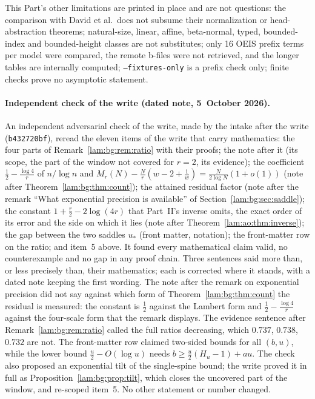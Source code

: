 \documentclass[11pt,a4paper]{article}
\numberwithin{equation}{section}
\theoremstyle{remark}
\begin{document}
This Part's other limitations are printed in place and are not questions: the comparison with David et al.\ does not subsume their normalization or head-abstraction theorems; natural-size, linear, affine, beta-normal, typed, bounded-index and bounded-height classes are not substitutes; only 16 OEIS prefix terms per model were compared, the remote b-files were not retrieved, and the longer tables are internally computed; \texttt{--fixtures-only} is a prefix check only; finite checks prove no asymptotic statement.

\paragraph{Independent check of the write (dated note, 5~October 2026).}
An independent adversarial check of the write, made by the intake after the write (\texttt{b432720bf}), reread the eleven items of the write that carry mathematics: the four parts of Remark~\ref{lam:bg:rem:ratio} with their proofs; the note after it (its scope, the part of the window not covered for $r=2$, its evidence); the coefficient $\frac12-\frac{\log4}r$ of $n/\log n$ and $M_r(N)-\frac Nr(w-2+\frac1w)=\frac N{2\log N}(1+o(1))$ (note after Theorem~\ref{lam:bg:thm:count}); the attained residual factor (note after the remark ``What exponential precision is available'' of Section~\ref{lam:bg:sec:saddle}); the constant $1+\frac r2-2\log(4r)$ that Part~II's inverse omits, the exact order of its error and the side on which it lies (note after Theorem~\ref{lam:ao:thm:inverse}); the gap between the two saddles $u_*$ (front matter, notation); the front-matter row on the ratio; and item~5 above. It found every mathematical claim valid, no counterexample and no gap in any proof chain. Three sentences said more than, or less precisely than, their mathematics; each is corrected where it stands, with a dated note keeping the first wording. The note after the remark on exponential precision did not say against which form of Theorem~\ref{lam:bg:thm:count} the residual is measured: the constant is $\frac12$ against the Lambert form and $\frac12-\frac{\log4}r$ against the four-scale form that the remark displays. The evidence sentence after Remark~\ref{lam:bg:rem:ratio} called the full ratios decreasing, which $0.737$, $0.738$, $0.732$ are not. The front-matter row claimed two-sided bounds for all $(b,u)$, while the lower bound $\frac u2-O(\log u)$ needs $b\ge\frac u2(H_u-1)+au$. The check also proposed an exponential tilt of the single-spine bound; the write proved it in full as Proposition~\ref{lam:bg:prop:tilt}, which closes the uncovered part of the window, and re-scoped item~5. No other statement or number changed.
\end{document}
